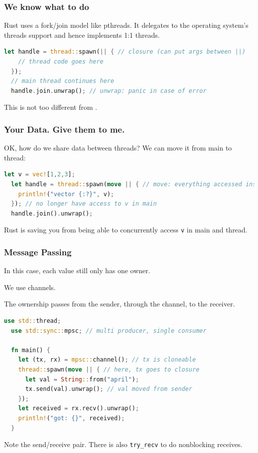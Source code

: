 \begin{frame}[fragile]
\frametitle{We know what to do}

Rust uses a fork/join model like pthreads. It delegates to the operating
system's threads support and hence implements 1:1 threads.
\begin{lstlisting}[language=Rust]
  let handle = thread::spawn(|| { // closure (can put args between ||)
    // thread code goes here
  });
  // main thread continues here
  handle.join.unwrap(); // unwrap: panic in case of error
\end{lstlisting}
This is not too different from \CPP.


\end{frame}


\begin{frame}[fragile]
\frametitle{Your Data. Give them to me.}

OK, how do we share data between threads? We can move it from main to thread:
\begin{lstlisting}[language=Rust]
  let v = vec![1,2,3];
  let handle = thread::spawn(move || { // move: everything accessed inside closure is moved
    println!("vector {:?}", v);
  }); // no longer have access to v in main
  handle.join().unwrap();
\end{lstlisting}
Rust is saving you from being able to concurrently access {\tt v} in main and thread.


\end{frame}


\begin{frame}[fragile]
\frametitle{Message Passing}

In this case, each value still only has one owner. 

We use \alert{channels}. 

The ownership passes
from the sender, through the channel, to the receiver.
\begin{lstlisting}[language=Rust]
  use std::thread;
  use std::sync::mpsc; // multi producer, single consumer

  fn main() {
    let (tx, rx) = mpsc::channel(); // tx is cloneable
    thread::spawn(move || { // here, tx goes to closure
      let val = String::from("april");
      tx.send(val).unwrap(); // val moved from sender
    });
    let received = rx.recv().unwrap();
    println!("got: {}", received);
  }
\end{lstlisting}
Note the send/receive pair. There is also {\tt try\_recv} to do nonblocking receives.


\end{frame}


